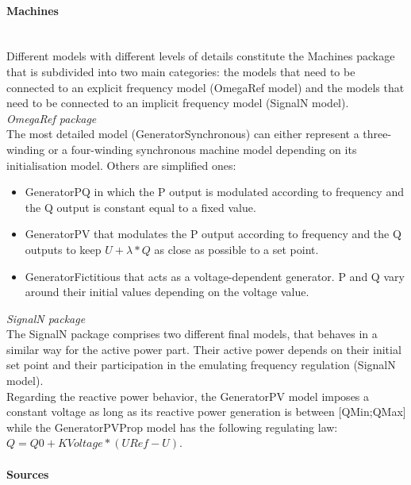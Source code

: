 \documentclass[a4paper, 12pt]{report}
\begin{document}
\paragraph{Machines}
~~\\

Different models with different levels of details constitute the Machines package that is subdivided into two main categories: the models that need to be connected to an explicit frequency model (OmegaRef model) and the models that need to be connected to an implicit frequency model (SignalN model). \\

\textit{OmegaRef package} \\

The most detailed model (GeneratorSynchronous) can either represent a three-winding or a four-winding synchronous machine model depending on its initialisation model. Others are simplified ones:
\begin{itemize}
\item GeneratorPQ in which the P output is modulated according to frequency and the Q output is constant equal to a fixed value.
\item GeneratorPV that modulates the P output according to frequency and the Q outputs to keep $U + \lambda * Q$ as close as possible to a set point.
\item GeneratorFictitious that acts as a voltage-dependent generator. P and Q vary around their initial values depending on the voltage value.
\end{itemize}
\medskip

\textit{SignalN package} \\

The SignalN package comprises two different final models, that behaves in a similar way for the active power part. Their active power depends on their initial set point and their participation in the emulating frequency regulation (SignalN model). \\ Regarding the reactive power behavior, the GeneratorPV model imposes a constant voltage as long as its reactive power generation is between [QMin;QMax] while the GeneratorPVProp model has the following regulating law: $Q = Q0 + KVoltage * (URef - U)$.

\paragraph{Sources}
~~\\
\end{document}
